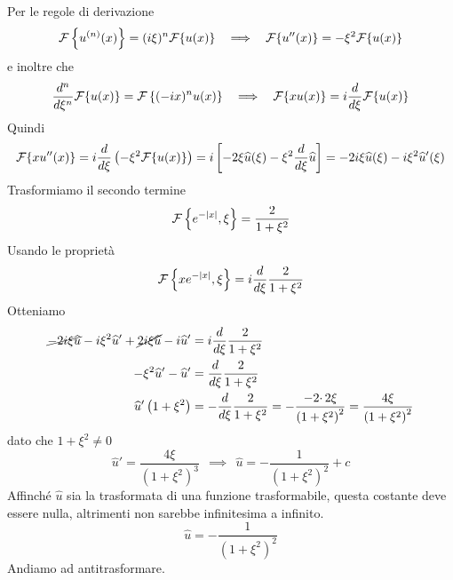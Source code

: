 Per le regole di derivazione
\begin{equation*}
\Fc \left\{u^{( n)}( x)\right\} =( i\xi )^{n}\Fc \{u( x)\} \ \ \implies \ \ \Fc \{u''( x)\} =-\xi ^{2}\Fc \{u( x)\}
\end{equation*}
e inoltre che
\begin{equation*}
\frac{d^{n}}{d\xi ^{n}}\Fc \{u( x)\} =\Fc \left\{( -ix)^{n} u( x)\right\} \ \ \implies \ \ \Fc \{xu( x)\} =i\frac{d}{d\xi }\Fc \{u( x)\}
\end{equation*}
Quindi
\begin{equation*}
\Fc \{xu''( x)\} =i\frac{d}{d\xi }\left( -\xi ^{2}\Fc \{u( x)\}\right) =i\left[ -2\xi \hat{u}( \xi ) -\xi ^{2}\frac{d}{d\xi }\hat{u}\right] =-2i\xi \hat{u}( \xi ) -i\xi ^{2}\hat{u} '( \xi )
\end{equation*}
Trasformiamo il secondo termine
\begin{equation*}
\Fc \left\{e^{-| x| } ,\xi \right\} =\frac{2}{1+\xi ^{2}}
\end{equation*}
Usando le proprietà
\begin{equation*}
\Fc \left\{xe^{-| x| } ,\xi \right\} =i\frac{d}{d\xi }\frac{2}{1+\xi ^{2}}
\end{equation*}
Otteniamo
\begin{align*}
\cancel{-2i\xi \hat{u}} -i\xi ^{2}\hat{u} '+\cancel{2i\xi \hat{u}} -i\hat{u} ' & =i\frac{d}{d\xi }\frac{2}{1+\xi ^{2}}\\
-\xi ^{2}\hat{u} '-\hat{u} ' & =\frac{d}{d\xi }\frac{2}{1+\xi ^{2}}\\
\hat{u} '\left( 1+\xi ^{2}\right) & =-\frac{d}{d\xi }\frac{2}{1+\xi ^{2}} =-\frac{-2\cdotp 2\xi }{\left( 1+\xi ^{2}\right)^{2}} =\frac{4\xi }{\left( 1+\xi ^{2}\right)^{2}}
\end{align*}
dato che $1+\xi ^{2} \neq 0$
\begin{equation*}
\hat{u} '=\frac{4\xi }{\left( 1+\xi ^{2}\right)^{3}} \ \ \implies \ \ \hat{u} =-\frac{1}{\left( 1+\xi ^{2}\right)^{2}} +c
\end{equation*}
Affinché $\hat{u}$ sia la trasformata di una funzione trasformabile, questa costante deve essere nulla, altrimenti non sarebbe infinitesima a infinito.
\begin{equation*}
\hat{u} =-\frac{1}{\left( 1+\xi ^{2}\right)^{2}}
\end{equation*}
Andiamo ad antitrasformare.

